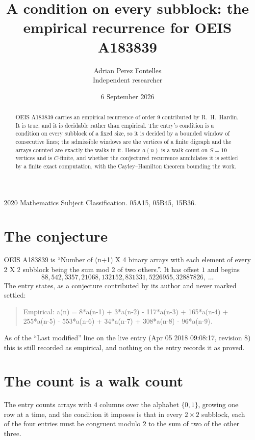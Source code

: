 \documentclass[11pt,a4paper]{article}
\title{A condition on every subblock: the empirical recurrence for OEIS A183839}
\author{Adrian Perez Fontelles\\ \small Independent researcher}
\date{6 September 2026}
\theoremstyle{plain}
\theoremstyle{definition}
\begin{document}
\maketitle

\begin{abstract}
OEIS A183839 carries an empirical recurrence of order $9$ contributed by R.~H.~Hardin. It is
true, and it is decidable rather than empirical. The entry's condition is a condition on every
subblock of a fixed size, so it is decided by a bounded window of consecutive lines; the
admissible windows are the vertices of a finite digraph and the arrays counted are exactly the
walks in it. Hence $a(n)$ is a walk count on $S=10$ vertices and is $C$-finite, and whether the
conjectured recurrence annihilates it is settled by a finite exact computation, with the
Cayley--Hamilton theorem bounding the work.
\end{abstract}

\noindent\small 2020 Mathematics Subject Classification. 05A15, 05B45, 15B36.\normalsize

\section{The conjecture}

OEIS A183839 is ``Number of (n+1) X 4 binary arrays with each element of every 2 X 2 subblock being the sum mod 2 of two others.''. It has offset $1$ and begins
\[
88, 542, 3357, 21068, 132152, 831331, 5226955, 32887826,\ \dots
\]
The entry states, as a conjecture contributed by its author and never marked settled:
\begin{quote}
Empirical: a(n) = 8*a(n-1) + 3*a(n-2) - 117*a(n-3) + 165*a(n-4) + 255*a(n-5) - 553*a(n-6) + 34*a(n-7) + 308*a(n-8) - 96*a(n-9).
\end{quote}
As of the ``Last modified'' line on the live entry (Apr 05 2018 09:08:17, revision 8) this is still
recorded as empirical, and nothing on the entry records it as proved.

\section{The count is a walk count}

The entry counts arrays with $4$ columns over the alphabet $\{0,1\}$, growing one row at a time, and the condition it imposes is that in every $2\times2$ subblock, each of the four entries must be congruent modulo $2$ to the sum of two of the other three.
\end{document}

